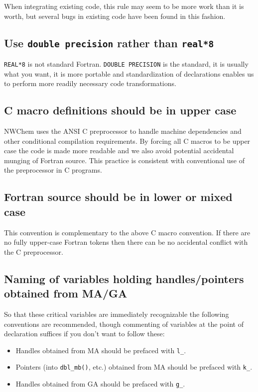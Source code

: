 When integrating existing code, this rule may seem to be more work than
it is worth, but several bugs in existing code have been found in this
fashion.

\subsection{Use {\tt double precision} rather than {\tt real*8}}

{\tt REAL*8} is not standard Fortran.  {\tt DOUBLE PRECISION} is the
standard, it is usually what you want, it is more portable and
standardization of declarations enables us to perform more readily 
necessary code transformations.

\subsection{C macro definitions should be in upper case}

NWChem uses the ANSI C preprocessor to handle machine dependencies and
other conditional compilation requirements.  By forcing all C macros
to be upper case the code is made more readable and we also avoid
potential accidental munging of Fortran source.  This practice is
consistent with conventional use of the preprocessor in C programs.

\subsection{Fortran source should be in lower or mixed case}

This convention is complementary to the above C macro convention.
If there are no fully upper-case Fortran tokens then there can
be no accidental conflict with the C preprocessor.


\subsection{Naming of variables holding handles/pointers obtained from
  MA/GA}

So that these critical variables are immediately recognizable the
following conventions are recommended, though commenting of
variables at the point of declaration suffices if you don't want to
follow these:
\begin{itemize}
\item Handles obtained from MA should be prefaced with {\tt l\_}.
\item Pointers (into {\tt dbl\_mb()}, etc.) obtained from MA should be
  prefaced with {\tt k\_}.
\item Handles obtained from GA should be prefaced with {\tt g\_}.
\end{itemize}



